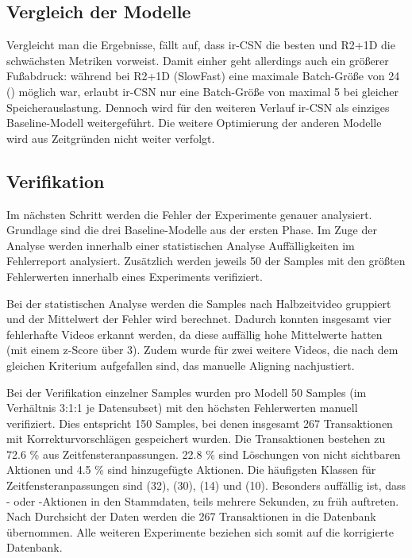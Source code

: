 \subsection{Vergleich der Modelle}
\label{subsec:vergleich-der-modelle}

Vergleicht man die Ergebnisse, fällt auf, dass ir-CSN die besten und R2+1D die schwächsten Metriken vorweist.
Damit einher geht allerdings auch ein größerer Fußabdruck:
während bei R2+1D (\bzw SlowFast) eine maximale Batch-Größe von 24 () möglich war, erlaubt ir-CSN nur eine Batch-Größe von maximal 5 bei gleicher Speicherauslastung.
Dennoch wird für den weiteren Verlauf ir-CSN als einziges Baseline-Modell weitergeführt.
Die weitere Optimierung der anderen Modelle wird aus Zeitgründen nicht weiter verfolgt.

\subsection{Verifikation}
\label{sec:verifikation}

Im nächsten Schritt werden die Fehler der Experimente genauer analysiert.
Grundlage sind die drei Baseline-Modelle aus der ersten Phase.
Im Zuge der Analyse werden innerhalb einer statistischen Analyse Auffälligkeiten im Fehlerreport analysiert.
Zusätzlich werden jeweils 50 der Samples mit den größten Fehlerwerten innerhalb eines Experiments verifiziert.

Bei der statistischen Analyse werden die Samples nach Halbzeitvideo gruppiert und der Mittelwert der Fehler wird berechnet.
Dadurch konnten insgesamt vier fehlerhafte Videos erkannt werden, da diese auffällig hohe Mittelwerte hatten (mit einem z-Score über 3).
Zudem wurde für zwei weitere Videos, die nach dem gleichen Kriterium aufgefallen sind, das manuelle Aligning nachjustiert.

Bei der Verifikation einzelner Samples wurden pro Modell 50 Samples (im Verhältnis 3:1:1 je Datensubset) mit den höchsten Fehlerwerten manuell verifiziert.
Dies entspricht 150 Samples, bei denen insgesamt 267 Transaktionen mit Korrekturvorschlägen gespeichert wurden.
Die Transaktionen bestehen zu 72.6 \% aus Zeitfensteranpassungen.
22.8 \% sind Löschungen von nicht sichtbaren Aktionen und 4.5 \% sind hinzugefügte Aktionen.
Die häufigsten Klassen für Zeitfensteranpassungen sind  (32),  (30),  (14) und  (10).
Besonders auffällig ist, dass \zB {}- oder -Aktionen in den Stammdaten, teils mehrere Sekunden, zu früh auftreten.
Nach Durchsicht der Daten werden die 267 Transaktionen in die Datenbank übernommen.
Alle weiteren Experimente beziehen sich somit auf die korrigierte Datenbank.

